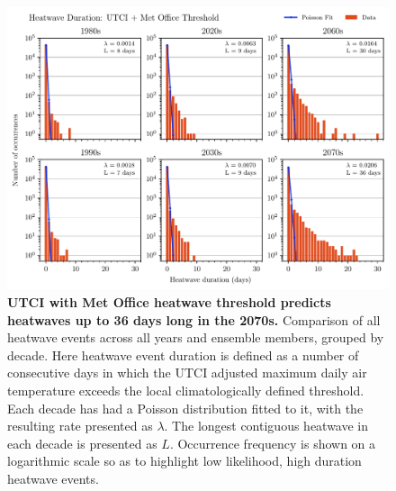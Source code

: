 \documentclass[10pt,letterpaper]{article}
\begin{document}
\begin{figure}
\begin{adjustwidth}{-2.25in}{0in}
    \begin{center}
        \includegraphics[width=\linewidth]{./utci_poisson.pdf}
    \end{center}
    \caption{
    {\bf UTCI with Met Office heatwave threshold predicts heatwaves up to 36 days long in the 2070s.}
    Comparison of all heatwave events across all years and ensemble members, grouped by decade.
    Here heatwave event duration is defined as a number of consecutive days in which the UTCI adjusted maximum daily air temperature exceeds the local climatologically defined threshold.
    Each decade has had a Poisson distribution fitted to it, with the resulting rate presented as $\lambda$.
    The longest contiguous heatwave in each decade is presented as $L$.
    Occurrence frequency is shown on a logarithmic scale so as to highlight low likelihood, high duration heatwave events.
    }
    \label{utci-poisson}
\end{adjustwidth}
\end{figure}
\end{document}

